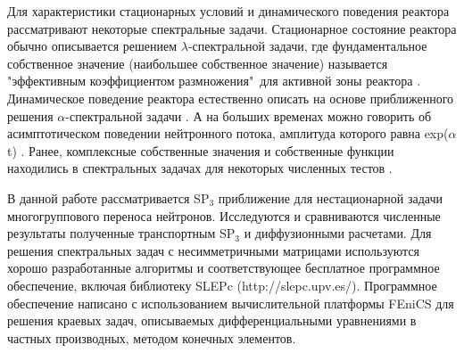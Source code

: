 \documentclass{crm-article}
\begin{document}
Для характеристики стационарных условий и динамического поведения реактора рассматривают некоторые спектральные задачи.
Стационарное состояние реактора обычно описывается решением $\lambda$-спектральной задачи, где фундаментальное собственное значение (наибольшее собственное значение) называется "эффективным коэффициентом размножения"\ для активной зоны реактора \cite{bell1970}. 
Динамическое поведение реактора естественно описать на основе приближенного решения $\alpha$-спектральной задачи \cite{verdu2010, carreno2017}.
А на больших временах можно говорить об асимптотическом поведении нейтронного потока, амплитуда которого равна exp($\alpha$t) \cite{avvakumov2017mm}.  
Ранее, комплексные собственные значения и собственные функции находились в спектральных задачах для некоторых численных тестов \cite{avvakumov2017, avvakumov2018}.

В данной работе рассматривается SP$_3$ приближение для нестационарной задачи многогруппового переноса нейтронов.
Исследуются и сравниваются численные результаты полученные транспортным SP$_3$ и диффузионными расчетами.
Для решения спектральных задач с несимметричными матрицами используются хорошо разработанные алгоритмы и соответствующее бесплатное программное обеспечение, включая библиотеку SLEPc (http://slepc.upv.es/).
Программное обеспечение написано с использованием вычислительной платформы FEniCS \cite{logg2012} для решения краевых задач, описываемых дифференциальными уравнениями в частных производных, методом конечных элементов.
\end{document}
